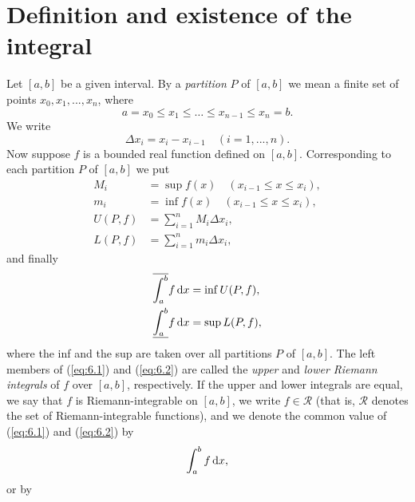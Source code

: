 \section{Definition and existence of the integral}
\begin{myDef}
    \label{myDef:6.1}
    Let $[a, b]$ be a given interval. 
    By a \emph{partition} $P$ of $[a, b]$ 
    we mean a finite set of points $x_0, x_1, ... , x_n$, where
    \begin{equation*}
        a = x_0 \leq x_1 \leq \dots \leq x_{n-1} \leq x_n = b.
    \end{equation*}
    We write
    \begin{equation*}
        \Delta x_i = x_i - x_{i-1}
        \quad    (i=1, ... ,n).
    \end{equation*}
    Now suppose $f$ is a bounded real function defined on $[a, b ]$. 
    Corresponding to each partition $P$ of $[a, b]$ we put
    \begin{align*}
        M_i &= \sup f(x) \quad (x_{i-1} \leq x \leq x_i), \\
        m_i &= \inf f(x) \quad (x_{i-1} \leq x \leq x_i), \\
        U(P,f) &= \sum_{i=1}^{n} M_i \Delta x_i,\\
        L(P,f) &= \sum_{i=1}^{n} m_i \Delta x_i,
    \end{align*}
    and finally
    \begin{align}
        \label{eq:6.1}
        \overline{\int_{a}^{b}} f \d x &= \inf U(P, f), \\
        \label{eq:6.2}
        \underline{\int_{a}^{b}} f \d x &= \sup L(P, f),
    \end{align}
    where the inf and the sup are taken over all partitions $P$ of $[a, b]$. 
    The left members of (\ref{eq:6.1}) and (\ref{eq:6.2}) are called 
    the \emph{upper} and \emph{lower Riemann integrals} of $f$
    over $[a, b]$, respectively.
    If the upper and lower integrals are equal, 
    we say that $f$ is Riemann-integrable on $[a, b]$, 
    we write $f \in \mathscr{R}$ 
    (that is, $\mathscr{R}$ denotes the set of Riemann-integrable functions), 
    and we denote the common value of (\ref{eq:6.1}) and (\ref{eq:6.2}) by
    \begin{equation}
        \label{eq:6.3}
        \int_{a}^{b} f \d x,
    \end{equation}
    or by 
    \begin{equation}

\end{equation}
\end{myDef}
